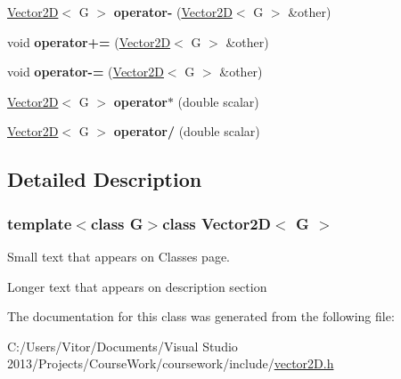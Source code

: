 \begin{DoxyCompactItemize}
\item 
\hypertarget{class_vector2_d_ad596163bb0fd596e54908b0205399562}{}\hyperlink{class_vector2_d}{Vector2\+D}$<$ G $>$ {\bfseries operator-\/} (\hyperlink{class_vector2_d}{Vector2\+D}$<$ G $>$ \&other)\label{class_vector2_d_ad596163bb0fd596e54908b0205399562}

\item 
\hypertarget{class_vector2_d_aa942145570266bd0542ed4fa5f7566ea}{}void {\bfseries operator+=} (\hyperlink{class_vector2_d}{Vector2\+D}$<$ G $>$ \&other)\label{class_vector2_d_aa942145570266bd0542ed4fa5f7566ea}

\item 
\hypertarget{class_vector2_d_ad2a09c22b855df93971a7f6c5abe6c39}{}void {\bfseries operator-\/=} (\hyperlink{class_vector2_d}{Vector2\+D}$<$ G $>$ \&other)\label{class_vector2_d_ad2a09c22b855df93971a7f6c5abe6c39}

\item 
\hypertarget{class_vector2_d_a1dafa1de876f5527a254b043f633c57a}{}\hyperlink{class_vector2_d}{Vector2\+D}$<$ G $>$ {\bfseries operator$\ast$} (double scalar)\label{class_vector2_d_a1dafa1de876f5527a254b043f633c57a}

\item 
\hypertarget{class_vector2_d_a4b9d085f69889b8dccb1cf3993965713}{}\hyperlink{class_vector2_d}{Vector2\+D}$<$ G $>$ {\bfseries operator/} (double scalar)\label{class_vector2_d_a4b9d085f69889b8dccb1cf3993965713}

\end{DoxyCompactItemize}


\subsection{Detailed Description}
\subsubsection*{template$<$class G$>$class Vector2\+D$<$ G $>$}

Small text that appears on Classes page. 

Longer text that appears on description section 

The documentation for this class was generated from the following file\+:\begin{DoxyCompactItemize}
\item 
C\+:/\+Users/\+Vitor/\+Documents/\+Visual Studio 2013/\+Projects/\+Course\+Work/coursework/include/\hyperlink{vector2_d_8h}{vector2\+D.\+h}\end{DoxyCompactItemize}
